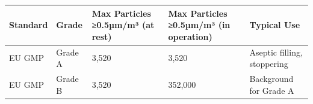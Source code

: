 \documentclass[
  11pt,
  a4paper,
]{report}
\begin{document}
\begin{longtable}[]{@{}lllll@{}}
\toprule
\begin{minipage}[b]{0.08\columnwidth}\raggedright
Standard\strut
\end{minipage} & \begin{minipage}[b]{0.06\columnwidth}\raggedright
Grade\strut
\end{minipage} & \begin{minipage}[b]{0.29\columnwidth}\raggedright
Max Particles ≥0.5µm/m³ (at rest)\strut
\end{minipage} & \begin{minipage}[b]{0.33\columnwidth}\raggedright
Max Particles ≥0.5µm/m³ (in operation)\strut
\end{minipage} & \begin{minipage}[b]{0.10\columnwidth}\raggedright
Typical Use\strut
\end{minipage}\tabularnewline
\midrule
\endhead
\begin{minipage}[t]{0.08\columnwidth}\raggedright
EU GMP\strut
\end{minipage} & \begin{minipage}[t]{0.06\columnwidth}\raggedright
Grade A\strut
\end{minipage} & \begin{minipage}[t]{0.29\columnwidth}\raggedright
3,520\strut
\end{minipage} & \begin{minipage}[t]{0.33\columnwidth}\raggedright
3,520\strut
\end{minipage} & \begin{minipage}[t]{0.10\columnwidth}\raggedright
Aseptic filling, stoppering\strut
\end{minipage}\tabularnewline
\begin{minipage}[t]{0.08\columnwidth}\raggedright
EU GMP\strut
\end{minipage} & \begin{minipage}[t]{0.06\columnwidth}\raggedright
Grade B\strut
\end{minipage} & \begin{minipage}[t]{0.29\columnwidth}\raggedright
3,520\strut
\end{minipage} & \begin{minipage}[t]{0.33\columnwidth}\raggedright
352,000\strut
\end{minipage} & \begin{minipage}[t]{0.10\columnwidth}\raggedright
Background for Grade A\strut
\end{minipage}\tabularnewline

\end{longtable}
\end{document}
